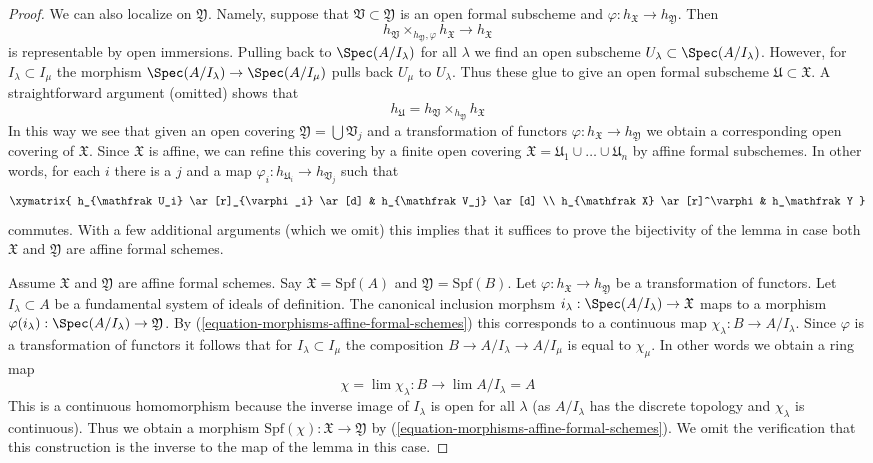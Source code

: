 \begin{proof}
\medskip\noindent
We can also localize on $\mathfrak Y$.
Namely, suppose that $\mathfrak V \subset \mathfrak Y$ is an
open formal subscheme and $\varphi : h_\mathfrak X \to h_\mathfrak Y$.
Then
$$
h_\mathfrak V \times_{h_\mathfrak Y, \varphi} h_\mathfrak X \to h_\mathfrak X
$$
is representable by open immersions. Pulling back to
$\Spec(A/I_\lambda)$ for all $\lambda$ we find an open subscheme
$U_\lambda \subset \Spec(A/I_\lambda)$. However, for
$I_\lambda \subset I_\mu$ the morphism $\Spec(A/I_\lambda) \to \Spec(A/I_\mu)$
pulls back $U_\mu$ to $U_\lambda$. Thus these glue to give
an open formal subscheme $\mathfrak U \subset \mathfrak X$.
A straightforward argument (omitted) shows that
$$
h_\mathfrak U = h_\mathfrak V \times_{h_\mathfrak Y} h_\mathfrak X
$$
In this way we see that given an open covering
$\mathfrak Y = \bigcup \mathfrak V_j$ and a transformation
of functors $\varphi :  h_\mathfrak X \to h_\mathfrak Y$
we obtain a corresponding open covering of $\mathfrak X$.
Since $\mathfrak X$ is affine, we can refine this covering by
a finite open covering
$\mathfrak X = \mathfrak U_1 \cup \ldots \cup \mathfrak U_n$
by affine formal subschemes. In other words, for each $i$ there
is a $j$ and a map $\varphi_i : h_{\mathfrak U_i} \to h_{\mathfrak V_j}$
such that
$$
\xymatrix{
h_{\mathfrak U_i} \ar[r]_{\varphi_i} \ar[d] & h_{\mathfrak V_j} \ar[d] \\
h_{\mathfrak X} \ar[r]^\varphi & h_\mathfrak Y
}
$$
commutes. With a few additional arguments (which we omit) this implies
that it suffices to prove the bijectivity of the lemma in case
both $\mathfrak X$ and $\mathfrak Y$ are affine formal schemes.

\medskip\noindent
Assume $\mathfrak X$ and $\mathfrak Y$ are affine formal schemes.
Say $\mathfrak X = \text{Spf}(A)$ and $\mathfrak Y = \text{Spf}(B)$.
Let $\varphi : h_\mathfrak X \to h_\mathfrak Y$ be a transformation
of functors. Let $I_\lambda \subset A$ be a fundamental system of
ideals of definition. The canonical inclusion morphsm
$i_\lambda : \Spec(A/I_\lambda) \to \mathfrak X$ maps to a morphism
$\varphi(i_\lambda) : \Spec(A/I_\lambda) \to \mathfrak Y$.
By (\ref{equation-morphisms-affine-formal-schemes}) this corresponds
to a continuous map $\chi_\lambda : B \to A/I_\lambda$.
Since $\varphi$ is a transformation of functors it follows
that for $I_\lambda \subset I_\mu$ the composition
$B \to A/I_\lambda \to A/I_\mu$ is equal to $\chi_\mu$.
In other words we obtain a ring map
$$
\chi = \lim \chi_\lambda : B \longrightarrow \lim A/I_\lambda = A
$$
This is a continuous homomorphism because the inverse image
of $I_\lambda$ is open for all $\lambda$ (as $A/I_\lambda$ has the discrete
topology and $\chi_\lambda$ is continuous). Thus we obtain
a morphism $\text{Spf}(\chi) : \mathfrak X \to \mathfrak Y$ by
(\ref{equation-morphisms-affine-formal-schemes}).
We omit the verification that this construction is the inverse
to the map of the lemma in this case.


\end{proof}
